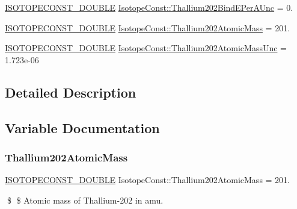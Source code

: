 \begin{DoxyCompactItemize}
\mbox{\hyperlink{group___isotope_const-_macros_ga8f45a7272ce02c0b4c65c44636ed719a}{I\+S\+O\+T\+O\+P\+E\+C\+O\+N\+S\+T\+\_\+\+D\+O\+U\+B\+LE}} \mbox{\hyperlink{group___isotope_const-_thallium-_tl202_ga4db8668f37e56d1ed503d7559aabfc0a}{Isotope\+Const\+::\+Thallium202\+Bind\+E\+Per\+A\+Unc}} = 0.
\item 
\mbox{\hyperlink{group___isotope_const-_macros_ga8f45a7272ce02c0b4c65c44636ed719a}{I\+S\+O\+T\+O\+P\+E\+C\+O\+N\+S\+T\+\_\+\+D\+O\+U\+B\+LE}} \mbox{\hyperlink{group___isotope_const-_thallium-_tl202_gab510ccf076cd77668f39c9b80d052702}{Isotope\+Const\+::\+Thallium202\+Atomic\+Mass}} = 201.
\item 
\mbox{\hyperlink{group___isotope_const-_macros_ga8f45a7272ce02c0b4c65c44636ed719a}{I\+S\+O\+T\+O\+P\+E\+C\+O\+N\+S\+T\+\_\+\+D\+O\+U\+B\+LE}} \mbox{\hyperlink{group___isotope_const-_thallium-_tl202_ga20d57eecff95a5416b18219440ac1b81}{Isotope\+Const\+::\+Thallium202\+Atomic\+Mass\+Unc}} = 1.\+723e-\/06
\end{DoxyCompactItemize}


\subsection{Detailed Description}


\subsection{Variable Documentation}
\mbox{\label{group___isotope_const-_thallium-_tl202_gab510ccf076cd77668f39c9b80d052702}} 
\subsubsection{\texorpdfstring{Thallium202\+Atomic\+Mass}{Thallium202AtomicMass}}
{\footnotesize\ttfamily \mbox{\hyperlink{group___isotope_const-_macros_ga8f45a7272ce02c0b4c65c44636ed719a}{I\+S\+O\+T\+O\+P\+E\+C\+O\+N\+S\+T\+\_\+\+D\+O\+U\+B\+LE}} Isotope\+Const\+::\+Thallium202\+Atomic\+Mass = 201.}

\$ \$ Atomic mass of Thallium-\/202 in amu. \mbox{\label{group___isotope_const-_thallium-_tl202_ga20d57eecff95a5416b18219440ac1b81}} 
